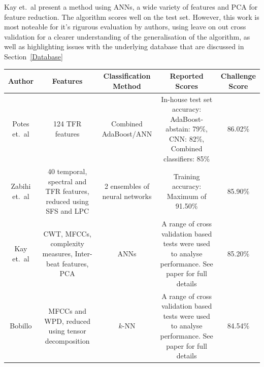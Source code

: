 \documentclass[titlepage, 12pt]{scrartcl} \usepackage{enumitem}
\newcommand{\dtoprule}{\specialrule{1pt}{0pt}{1.4pt}%
            \specialrule{1pt}{0pt}{\belowrulesep}%
            }
\begin{document}
Kay et.\ al present a method using ANNs, a wide variety of features and PCA for
feature reduction. The algorithm scores well on the test set. However, this
work is most noteable for it's rigurous evaluation by authors, using leave on
out cross validation for a clearer understanding of  the generalisation of the
algorithm, as well as highlighting issues with the underlying database that are
discussed in Section~\ref{Database}


\begin{landscape}
\begin{table}[H]
    \label{PhysionetTable}
\scriptsize
{}
\doublespacing
\begin{tabulary}{\linewidth}{CCCCC}
\dtoprule
Author                                           & Features                                                                        & Classification Method                                    & Reported Scores                                                                                      & Challenge Score \\ \midrule
Potes et.~al \citeyearpar{Potes2016}             & 124 TFR features                                                                & Combined AdaBoost/ANN                                    & In-house test set accuracy: AdaBoost-abstain: 79\%, CNN: 82\%, Combined classifiers: 85\%            & 86.02\%         \\
Zabihi et.~al \citeyearpar{Zabihi2016}           & 40 temporal, spectral and TFR features, reduced using SFS and LPC               & 2 ensembles of neural networks                           & Training accuracy: Maximum of 91.50\%                                                                & 85.90\%         \\
Kay et.~al \citeyearpar{Kay2017}                 & CWT, MFCCs, complexity measures, Inter-beat features, PCA                       & ANNs                                                     & A range of cross validation based tests were used to analyse performance. See paper for full details & 85.20\%         \\
Bobillo \citeyearpar{Bobillo2016}                & MFCCs and WPD, reduced using tensor decomposition                               & $k$-NN                                                   & A range of cross validation based tests were used to analyse performance. See paper for full details & 84.54\%         \\

\end{tabulary}
\end{table}
\end{landscape}
\end{document}
